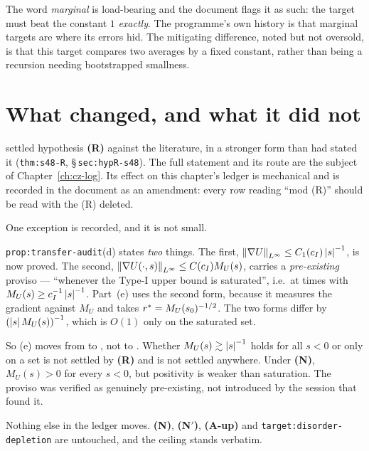 The word \emph{marginal} is load-bearing and the document flags it as such:
the target must beat the constant \(1\) \emph{exactly}. The programme's own
history is that marginal targets are where its errors hid. The mitigating
difference, noted but not oversold, is that this target compares two averages
by a fixed constant, rather than being a recursion needing bootstrapped
smallness.

\section{\texorpdfstring{What  changed, and what it did not}{What S48 changed, and what it did not}}
\label{sec:s48-effect}

 settled hypothesis \textbf{(R)} against the literature, in a stronger
form than  had stated it (\texttt{thm:s48-R},
\S\,\texttt{sec:hypR-s48}). The full statement and its route are the subject of
Chapter~\ref{ch:cz-log}. Its effect on this chapter's
ledger is mechanical and is recorded in the document as an amendment: every
row reading ``mod (R)'' should be read with the (R) deleted.

One exception is recorded, and it is not small.

\begin{obsv}
\label{obs:saturation}
\texttt{prop:transfer-audit}(d) states \emph{two} things. The first,
\(\left\|\nabla U\right\|_{L^\infty}\le C_1(c_I)\left|s\right|^{-1}\), is now proved. The
second, \(\left\|\nabla U(\cdot,s)\right\|_{L^\infty}\le C(c_I)M_U(s)\), carries a
\emph{pre-existing} proviso --- ``whenever the Type-I upper bound is
saturated'', i.e.\ at times with \(M_U(s)\ge c_I^{-1}\left|s\right|^{-1}\). Part~(e)
uses the second form, because it measures the gradient against \(M_U\) and
takes \(r^{*}=M_U(s_0)^{-1/2}\). The two forms differ by
\(\left(\left|s\right|M_U(s)\right)^{-1}\), which is \(O(1)\) only on the saturated
set.

\smallskip
So (e) moves from  to , not to \PROVED{}.
Whether \(M_U(s)\gtrsim\left|s\right|^{-1}\) holds for all \(s<0\) or only on a set is
not settled by \textbf{(R)} and is not settled anywhere. Under \textbf{(N)},
\(M_U(s)>0\) for every \(s<0\), but positivity is weaker than saturation. The
proviso was verified as genuinely pre-existing, not introduced by the session
that found it.
\end{obsv}

Nothing else in the ledger moves. \textbf{(N)}, \textbf{(N\('\))},
\textbf{(A-up)} and \texttt{target:disorder-depletion} are untouched, and the
ceiling stands verbatim.

